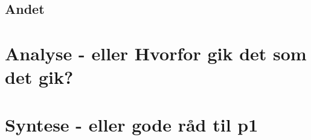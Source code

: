 \subsection{Andet}

\section{Analyse - eller Hvorfor gik det som det gik?}



\section{Syntese - eller gode råd til p1}








